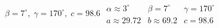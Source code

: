 { $\beta = 7^{\circ}, \; \gamma = 170^{\circ}, \; c = 98.6$ \label{anylawlast}}
{ $\begin{array}{lll}\alpha \approx 3^{\circ} & \beta = 7^{\circ} & \gamma = 170^{\circ} \\a \approx 29.72 & b \approx 69.2 & c = 98.6 \end{array}$}
